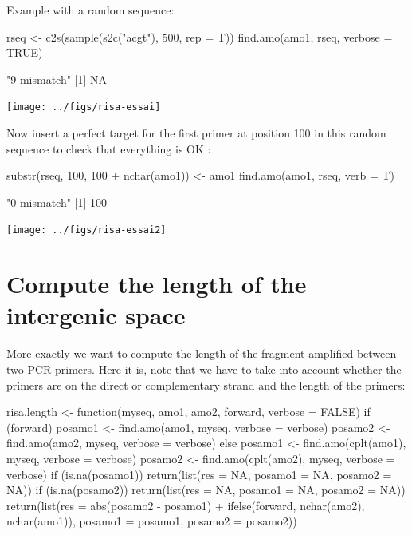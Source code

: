 \documentclass{article}
\begin{document}
Example with a random sequence:

\begin{Schunk}
\begin{Sinput}
 rseq <- c2s(sample(s2c("acgt"), 500, rep = T))
 find.amo(amo1, rseq, verbose = TRUE)
\end{Sinput}
\begin{Soutput}
[1] "9 mismatch"
[1] NA
\end{Soutput}
\end{Schunk}
\texttt{[image: ../figs/risa-essai]}

Now insert a perfect target for the first primer at position 100 in this random sequence
to check that everything is OK :

\begin{Schunk}
\begin{Sinput}
 substr(rseq, 100, 100 + nchar(amo1)) <- amo1
 find.amo(amo1, rseq, verb = T)
\end{Sinput}
\begin{Soutput}
[1] "0 mismatch"
[1] 100
\end{Soutput}
\end{Schunk}
\texttt{[image: ../figs/risa-essai2]}

\section{Compute the length of the intergenic space}

More exactly we want to compute the length of the fragment amplified
between two PCR primers. Here it is, note that we have to take into account
whether the primers are on the direct or complementary strand and the
length of the primers:

\begin{Schunk}
\begin{Sinput}
 risa.length <- function(myseq, amo1, amo2, forward, verbose = FALSE) {
     if (forward) {
         posamo1 <- find.amo(amo1, myseq, verbose = verbose)
         posamo2 <- find.amo(amo2, myseq, verbose = verbose)
     }
     else {
         posamo1 <- find.amo(cplt(amo1), myseq, verbose = verbose)
         posamo2 <- find.amo(cplt(amo2), myseq, verbose = verbose)
     }
     if (is.na(posamo1)) 
         return(list(res = NA, posamo1 = NA, posamo2 = NA))
     if (is.na(posamo2)) 
         return(list(res = NA, posamo1 = NA, posamo2 = NA))
     return(list(res = abs(posamo2 - posamo1) + ifelse(forward, 
         nchar(amo2), nchar(amo1)), posamo1 = posamo1, posamo2 = posamo2))
 }
\end{Sinput}
\end{Schunk}
\end{document}
